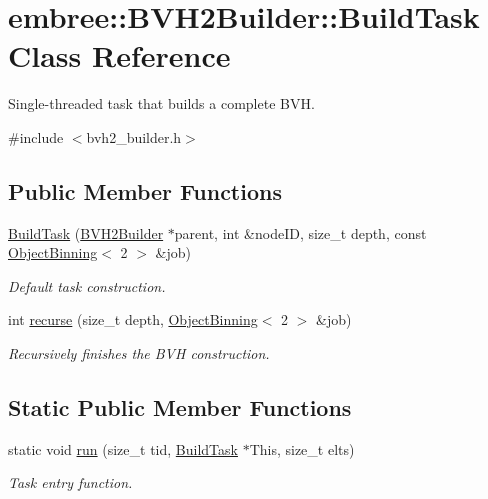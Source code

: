\hypertarget{classembree_1_1_b_v_h2_builder_1_1_build_task}{
\section{embree::BVH2Builder::BuildTask Class Reference}
\label{classembree_1_1_b_v_h2_builder_1_1_build_task}
}


Single-\/threaded task that builds a complete BVH.  




{\ttfamily \#include $<$bvh2\_\-builder.h$>$}

\subsection*{Public Member Functions}
\begin{DoxyCompactItemize}
\item 
\hyperlink{classembree_1_1_b_v_h2_builder_1_1_build_task_a50b0324e02c69c09e39b62b695f16858}{BuildTask} (\hyperlink{classembree_1_1_b_v_h2_builder}{BVH2Builder} $\ast$parent, int \&nodeID, size\_\-t depth, const \hyperlink{classembree_1_1_object_binning}{ObjectBinning}$<$ 2 $>$ \&job)
\begin{DoxyCompactList}\small\item\em Default task construction. \item\end{DoxyCompactList}\item 
int \hyperlink{classembree_1_1_b_v_h2_builder_1_1_build_task_a8a37d46c5fd460e8545cf899bcecb967}{recurse} (size\_\-t depth, \hyperlink{classembree_1_1_object_binning}{ObjectBinning}$<$ 2 $>$ \&job)
\begin{DoxyCompactList}\small\item\em Recursively finishes the BVH construction. \item\end{DoxyCompactList}\end{DoxyCompactItemize}
\subsection*{Static Public Member Functions}
\begin{DoxyCompactItemize}
\item 
static void \hyperlink{classembree_1_1_b_v_h2_builder_1_1_build_task_a60c4d349c27b23727886769d0b7a25b8}{run} (size\_\-t tid, \hyperlink{classembree_1_1_b_v_h2_builder_1_1_build_task}{BuildTask} $\ast$This, size\_\-t elts)
\begin{DoxyCompactList}\small\item\em Task entry function. \item\end{DoxyCompactList}\end{DoxyCompactItemize}


